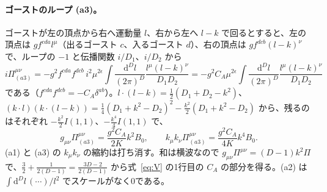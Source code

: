\documentclass[a4paper,10pt]{ltjsarticle}
\newcommand{\dd}{\mathrm{d}}
\begin{document}
\paragraph{ゴーストのループ (a3)。}ゴーストが左の頂点から右へ運動量 $l$、右から左へ $l-k$ で回るとすると、左の頂点は $gf^{cda}l^\mu$（出るゴースト $c$、入るゴースト $d$）、右の頂点は $gf^{dcb}(l-k)^\nu$ で、ループの $-1$ と伝播関数 $i/D_1$、$i/D_2$ から
\begin{equation*}
i\Pi^{\mu\nu}_{(a3)}=-g^2f^{cda}f^{dcb}\,i^2\mu^{2\epsilon}\int\frac{\dd^Dl}{(2\pi)^D}\frac{l^\mu(l-k)^\nu}{D_1D_2}=-g^2C_A\mu^{2\epsilon}\int\frac{\dd^Dl}{(2\pi)^D}\frac{l^\mu(l-k)^\nu}{D_1D_2}
\end{equation*}
である（$f^{cda}f^{dcb}=-C_A\delta^{ab}$）。$l\cdot(l-k)=\frac12(D_1+D_2-k^2)$、$(k\cdot l)(k\cdot(l-k))=\frac14(D_1+k^2-D_2)^2-\frac{k^2}2(D_1+k^2-D_2)$ から、残るのはそれぞれ $-\frac{k^2}2I(1,1)$、$-\frac{k^4}4I(1,1)$ で、
\begin{equation*}
g_{\mu\nu}\Pi^{\mu\nu}_{(a3)}=\frac{g^2C_A}{2K}k^2B_0,\qquad k_\mu k_\nu\Pi^{\mu\nu}_{(a3)}=\frac{g^2C_A}{4K}k^4B_0.
\end{equation*}
(a1) と (a3) の $k_\mu k_\nu$ の縮約は打ち消す。和は横波なので $g_{\mu\nu}\Pi^{\mu\nu}=(D-1)k^2\Pi$ で、$\frac32+\frac1{2(D-1)}=\frac{3D-2}{2(D-1)}$ から式~\eqref{eq:V} の1行目の $C_A$ の部分を得る。(a2) は $\int\dd^Dl\,(\cdots)/l^2$ でスケールがなく0である。
\end{document}
